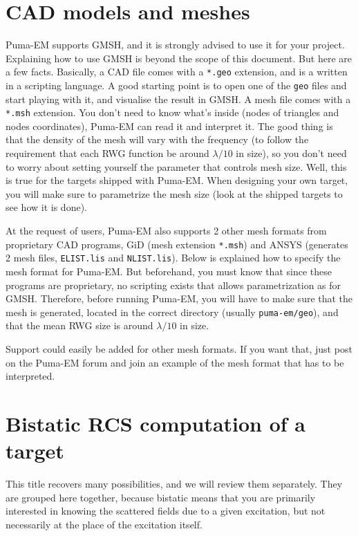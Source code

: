 \documentclass[a4paper,10pt]{book}
\begin{document}
\section{CAD models and meshes}
%
\par
Puma-EM supports GMSH, and it is strongly advised to use it for your project. Explaining how to use GMSH is beyond the scope of this document. But here are a few facts. Basically, a CAD file comes with a \texttt{*.geo} extension, and is a written in a scripting language. A good starting point is to open one of the \texttt{geo} files and start playing with it, and visualise the result in GMSH. A mesh file comes with a \texttt{*.msh} extension. You don't need to know what's inside (nodes of triangles and nodes coordinates), Puma-EM can read it and interpret it. The good thing is that the density of the mesh will vary with the frequency (to follow the requirement that each RWG function be around $\lambda/10$ in size), so you don't need to worry about setting yourself the parameter that controls mesh size. Well, this is true for the targets shipped with Puma-EM. When designing your own target, you will make sure to parametrize the mesh size (look at the shipped targets to see how it is done).
%
\par
At the request of users, Puma-EM also supports 2 other mesh formats from proprietary CAD programs, GiD (mesh extension \texttt{*.msh}) and ANSYS (generates 2 mesh files, \texttt{ELIST.lis} and \texttt{NLIST.lis}). Below is explained how to specify the mesh format for Puma-EM. But beforehand, you must know that since these programs are proprietary, no scripting exists that allows parametrization as for GMSH. Therefore, before running Puma-EM, you will have to make sure that the mesh is generated, located in the correct directory (usually \texttt{puma-em/geo}), and that the mean RWG size is around $\lambda/10$ in size.
%
\par
Support could easily be added for other mesh formats. If you want that, just post on the Puma-EM forum and join an example of the mesh format that has to be interpreted.

\section{Bistatic RCS computation of a target}
%
\par
This title recovers many possibilities, and we will review them separately. They are grouped here together, because bistatic means that you are primarily interested in knowing the scattered fields due to a given excitation, but not necessarily at the place of the excitation itself.
\end{document}
